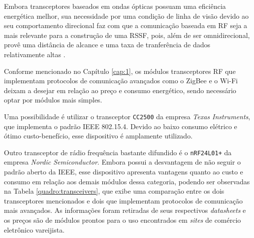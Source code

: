 Embora transceptores baseados em ondas ópticas possuam uma eficiência energética melhor, sua necessidade por
uma condição de linha de visão devido ao seu comportamento direcional faz com que a comunicação baseada em RF
seja a mais relevante para a construção de uma RSSF, pois, além de ser omnidirecional, provê uma distância de
alcance e uma taxa de tranferência de dados relativamente altas \cite{kuorilehto2007,karl_willig2005}.

Conforme mencionado no Capítulo \ref{cap:1}, os módulos transceptores RF que implementam protocolos de
comunicação avançados como o ZigBee e o Wi-Fi deixam a desejar em relação ao preço e consumo energético,
sendo necessário optar por módulos mais simples.

Uma possibilidade é utilizar o transceptor \texttt{CC2500} da empresa \textit{Texas Instruments}, que
implementa o padrão IEEE 802.15.4. Devido ao baixo consumo elétrico e ótimo custo-benefício, esse dispositivo
é amplamente utilizado.

Outro transceptor de rádio frequência bastante difundido é o \texttt{nRF24L01+} da empresa \textit{Nordic
Semiconductor}. Embora possui a desvantagem de não seguir o padrão aberto da IEEE, esse dispositivo apresenta
vantagens quanto ao custo e consumo em relação aos demais módulos dessa categoria, podendo ser observadas na
Tabela \ref{quadro:transceivers}, que exibe uma comparação entre os dois transceptores mencionados e dois que
implementam protocolos de comunicação mais avançados. As informações foram retiradas de seus respectivos
\textit{datasheets} e os preços são de módulos prontos para o uso encontrados em \textit{sites} de comércio
eletrônico vareijista.


